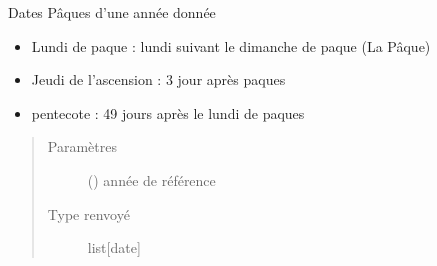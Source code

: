 \documentclass[letterpaper,10pt,french]{sphinxmanual}
\begin{document}
\begin{fulllineitems}
\label{\detokenize{modules/dtemng:toolbox.dtemng.datepaques}}
Dates Pâques d’une année donnée
\begin{itemize}
\item {} 
Lundi de paque : lundi suivant le dimanche de paque (La Pâque)

\item {} 
Jeudi de l’ascension : 3 jour après paques

\item {} 
pentecote : 49 jours après le lundi de paques

\end{itemize}
\begin{quote}\begin{description}
\item[{Paramètres}] \leavevmode
{} () \textendash{} année de référence

\item[{Type renvoyé}] \leavevmode
list{[}date{]}

\end{description}\end{quote}

\end{fulllineitems}

\end{document}
